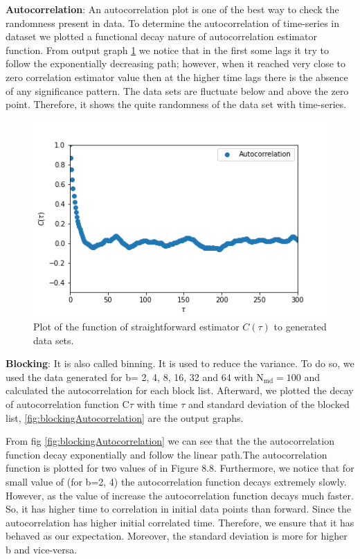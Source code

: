 \documentclass[11pt, a4paper, DIV=12]{scrartcl}
\begin{document}
\textbf{Autocorrelation}: An autocorrelation plot is one of the best way to check the randomness present in data. To determine the autocorrelation of time-series in dataset we plotted a functional decay nature of autocorrelation estimator function. From output graph \ref{fig:autocorrelation} we notice that in the first some lags it try to follow the exponentially decreasing path; however, when it reached very close to zero correlation estimator value then at the higher time lags there is the absence of any significance pattern. The data sets are fluctuate below and above the zero point. Therefore, it shows the quite randomness of the data set with time-series.
	
	\begin{figure}[H]
		\centering
		\includegraphics[width=0.6\linewidth]{autokorrelation.png}
		\caption{Plot of the function of straightforward estimator $ C(\tau) $ to generated data sets.}
		\label{fig:autocorrelation}
	\end{figure}
	
\textbf{Blocking}: It is also called binning. It is used to reduce the variance.
To do so, we used the data generated for b= 2, 4, 8, 16, 32 and 64 with $ \text{N}_{\text{md}}=100 $ and calculated the autocorrelation for each block list. Afterward, we plotted the decay of autocorrelation function C$ \tau $ with time $ \tau $ and standard deviation of the blocked list, \ref{fig:blockingAutocorrelation} are the output graphs.
	
From fig \ref{fig:blockingAutocorrelation} we can see that the the autocorrelation function decay exponentially and follow the linear path.The autocorrelation function is plotted for two values of  in Figure 8.8. Furthermore, we notice that for small value of (for b=2, 4) the autocorrelation function decays extremely slowly. However, as the value of  increase the autocorrelation function decays much faster. So, it has higher time to correlation in initial data points than forward. Since the autocorrelation has higher initial correlated time. Therefore, we ensure that it has behaved as our expectation. Moreover, the standard deviation is more for higher b and vice-versa.
	
\end{document}
